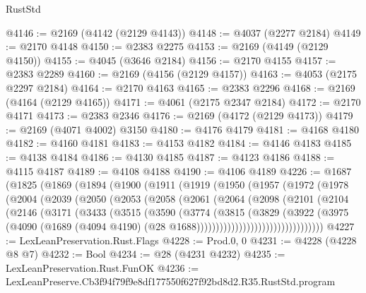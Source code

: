 \begin{lexlean}{RustStd}
\begin{coremodule}
@4146 := @2169 (@4142 (@2129 @4143))
@4148 := @4037 (@2277 @2184)
@4149 := @2170 @4148
@4150 := @2383 @2275
@4153 := @2169 (@4149 (@2129 @4150))
@4155 := @4045 (@3646 @2184)
@4156 := @2170 @4155
@4157 := @2383 @2289
@4160 := @2169 (@4156 (@2129 @4157))
@4163 := @4053 (@2175 @2297 @2184)
@4164 := @2170 @4163
@4165 := @2383 @2296
@4168 := @2169 (@4164 (@2129 @4165))
@4171 := @4061 (@2175 @2347 @2184)
@4172 := @2170 @4171
@4173 := @2383 @2346
@4176 := @2169 (@4172 (@2129 @4173))
@4179 := @2169 (@4071 @4002) @3150
@4180 := @4176 @4179
@4181 := @4168 @4180
@4182 := @4160 @4181
@4183 := @4153 @4182
@4184 := @4146 @4183
@4185 := @4138 @4184
@4186 := @4130 @4185
@4187 := @4123 @4186
@4188 := @4115 @4187
@4189 := @4108 @4188
@4190 := @4106 @4189
@4226 := @1687
    (@1825
      (@1869
        (@1894
          (@1900
            (@1911
              (@1919
                (@1950
                  (@1957
                    (@1972
                      (@1978
                        (@2004
                          (@2039
                            (@2050
                              (@2053
                                (@2058
                                  (@2061
                                    (@2064
                                      (@2098
                                        (@2101
                                          (@2104
                                            (@2146
                                              (@3171
                                                (@3433
                                                  (@3515
                                                    (@3590
                                                      (@3774
                                                        (@3815
                                                          (@3829
                                                            (@3922
                                                              (@3975
                                                                (@4090
                                                                  (@1689
                                                                    (@4094 @4190)
                                                                    (@28
                                                                      @1688)))))))))))))))))))))))))))))))))
@4227 := LexLeanPreservation.Rust.Flags
@4228 := Prod.{0, 0}
@4231 := @4228 (@4228 @8 @7)
@4232 := Bool
@4234 := @28 (@4231 @4232)
@4235 := LexLeanPreservation.Rust.FunOK
@4236 := LexLeanPreserve.Cb3f94f79f9e8df177550f627f92bd8d2.R35.RustStd.program

\end{coremodule}
\end{lexlean}
